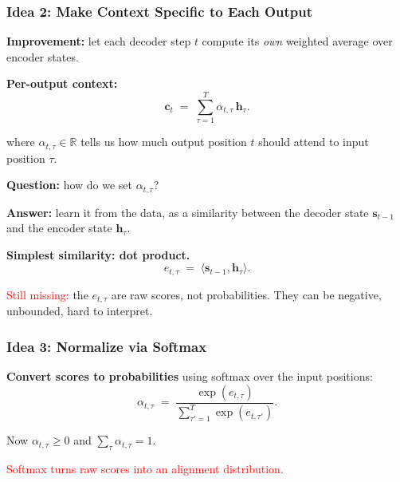 \documentclass[notes,11pt, aspectratio=169]{beamer}
\newcommand{\vc}{\mathbf{c}}
\newcommand{\vh}{\mathbf{h}}
\newcommand{\vs}{\mathbf{s}}
\newcommand{\R}{\mathbb{R}}
\begin{document}
\begin{frame}
\frametitle{Idea 2: Make Context Specific to Each Output}

\textbf{Improvement:} let each decoder step $t$ compute its \emph{own} weighted average over encoder states.

\vspace{6pt}
\textbf{Per-output context:}
\[
    \vc_t \;=\; \sum_{\tau=1}^T \alpha_{t,\tau}\, \vh_\tau.
\]

\vspace{4pt}
where $\alpha_{t,\tau} \in \R$ tells us how much output position $t$ should attend to input position $\tau$.

\vspace{8pt}
\textbf{Question:} how do we set $\alpha_{t,\tau}$?

\vspace{4pt}
\textbf{Answer:} learn it from the data, as a similarity between the decoder state $\vs_{t-1}$ and the encoder state $\vh_\tau$.

\vspace{8pt}
\textbf{Simplest similarity: dot product.}
\[
    e_{t,\tau} \;=\; \langle \vs_{t-1}, \vh_\tau \rangle.
\]

\textcolor{red}{Still missing:} the $e_{t,\tau}$ are raw scores, not probabilities. They can be negative, unbounded, hard to interpret.
\end{frame}

\begin{frame}
\frametitle{Idea 3: Normalize via Softmax}

\textbf{Convert scores to probabilities} using softmax over the input positions:
\[
    \alpha_{t,\tau} \;=\; \frac{\exp(e_{t,\tau})}{\sum_{\tau'=1}^T \exp(e_{t,\tau'})}.
\]

\vspace{4pt}
Now $\alpha_{t,\tau} \geq 0$ and $\sum_\tau \alpha_{t,\tau} = 1$.

\vspace{5pt}
\begin{center}
\end{center}

\vspace{3pt}
\textcolor{red}{Softmax turns raw scores into an alignment distribution.}
\end{frame}
\end{document}
